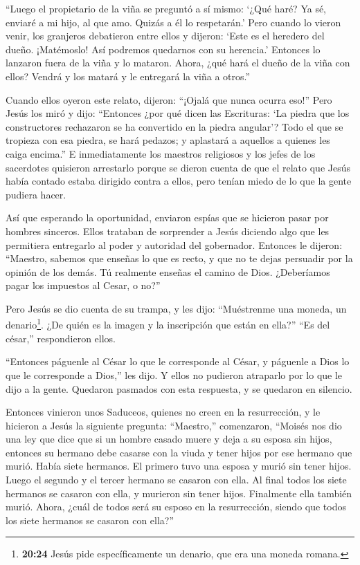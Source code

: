  ``Luego el propietario de la viña se preguntó a sí mismo:
`¿Qué haré? Ya sé, enviaré a mi hijo, al que amo. Quizás a él lo
respetarán.'  Pero cuando lo vieron venir, los granjeros
debatieron entre ellos y dijeron: `Este es el heredero del dueño.
¡Matémoslo! Así podremos quedarnos con su herencia.' 
Entonces lo lanzaron fuera de la viña y lo mataron. Ahora, ¿qué hará el
dueño de la viña con ellos?  Vendrá y los matará y le
entregará la viña a otros.''

Cuando ellos oyeron este relato, dijeron: ``¡Ojalá que nunca ocurra
eso!''  Pero Jesús los miró y dijo: ``Entonces ¿por qué
dicen las Escrituras: `La piedra que los constructores rechazaron se ha
convertido en la piedra angular'?  Todo el que se tropieza
con esa piedra, se hará pedazos; y aplastará a aquellos a quienes les
caiga encima.''  E inmediatamente los maestros religiosos y
los jefes de los sacerdotes quisieron arrestarlo porque se dieron cuenta
de que el relato que Jesús había contado estaba dirigido contra a ellos,
pero tenían miedo de lo que la gente pudiera hacer.

 Así que esperando la oportunidad, enviaron espías que se
hicieron pasar por hombres sinceros. Ellos trataban de sorprender a
Jesús diciendo algo que les permitiera entregarlo al poder y autoridad
del gobernador.  Entonces le dijeron: ``Maestro, sabemos
que enseñas lo que es recto, y que no te dejas persuadir por la opinión
de los demás. Tú realmente enseñas el camino de Dios. 
¿Deberíamos pagar los impuestos al Cesar, o no?''

 Pero Jesús se dio cuenta de su trampa, y les dijo:
 ``Muéstrenme una moneda, un denario\footnote{\textbf{20:24}
  Jesús pide específicamente un denario, que era una moneda romana.}.
¿De quién es la imagen y la inscripción que están en ella?'' ``Es del
césar,'' respondieron ellos.

 ``Entonces páguenle al César lo que le corresponde al
César, y páguenle a Dios lo que le corresponde a Dios,'' les dijo.
 Y ellos no pudieron atraparlo por lo que le dijo a la
gente. Quedaron pasmados con esta respuesta, y se quedaron en silencio.

 Entonces vinieron unos Saduceos, quienes no creen en la
resurrección, y le hicieron a Jesús la siguiente pregunta: 
``Maestro,'' comenzaron, ``Moisés nos dio una ley que dice que si un
hombre casado muere y deja a su esposa sin hijos, entonces su hermano
debe casarse con la viuda y tener hijos por ese hermano que murió.
 Había siete hermanos. El primero tuvo una esposa y murió
sin tener hijos.  Luego el segundo  y el
tercer hermano se casaron con ella. Al final todos los siete hermanos se
casaron con ella, y murieron sin tener hijos.  Finalmente
ella también murió.  Ahora, ¿cuál de todos será su esposo
en la resurrección, siendo que todos los siete hermanos se casaron con
ella?''

